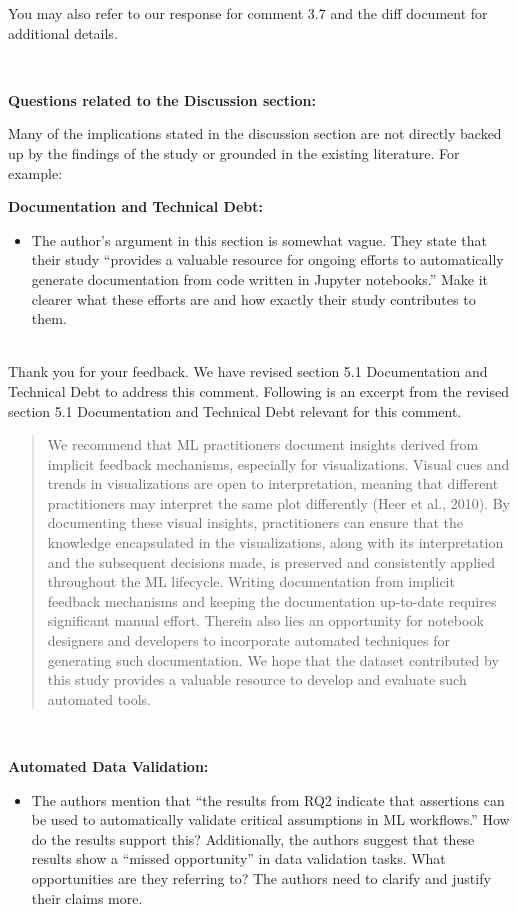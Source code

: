 \documentclass[11pt,fleqn]{article}
\newcommand{\eline}{\vspace*{.75\baselineskip}}
\newcommand{\Referee}[1]{\eline \noindent {\bf Reviewer comment #1:} \\}
\newcommand{\Us}{\eline \noindent {\bf Response:}\\}
\newenvironment{revcomment}[1][]
{\Referee{#1}\begin{rcomment}}
{\end{rcomment}}
\begin{document}
You may also refer to our response for comment 3.7 and the diff document for additional details.

\begin{revcomment}[3.11]
  \textbf{Questions related to the Discussion section:}

  Many of the implications stated in the discussion section are not directly backed up by the findings of the study or grounded in the existing literature. For example:

  \textbf{Documentation and Technical Debt:}

  \begin{itemize}
    \item The author's argument in this section is somewhat vague. They state that their study ``provides a valuable resource for ongoing efforts to automatically generate documentation from code written in Jupyter notebooks.'' Make it clearer what these efforts are and how exactly their study contributes to them.
  \end{itemize}
\end{revcomment}

\Us Thank you for your feedback. We have revised section 5.1 Documentation and Technical Debt to address this comment. Following is an excerpt from the revised section 5.1 Documentation and Technical Debt relevant for this comment.

\begin{quote}
  We recommend that ML practitioners document insights derived from implicit feedback mechanisms, especially for visualizations. Visual cues and trends in visualizations are open to interpretation, meaning that different practitioners may interpret the same plot differently (Heer et al., 2010). By documenting these visual insights, practitioners can ensure that the knowledge encapsulated in the visualizations, along with its interpretation and the subsequent decisions made, is preserved and consistently applied throughout the ML lifecycle. Writing documentation from implicit feedback mechanisms and keeping the documentation up-to-date requires significant manual effort. Therein also lies an opportunity for notebook designers and developers to incorporate automated techniques for generating such documentation. We hope that the dataset contributed by this study provides a valuable resource to develop and evaluate such automated tools.
\end{quote}

\begin{revcomment}[3.12]
  \textbf{Automated Data Validation:}

  \begin{itemize}
    \item The authors mention that ``the results from RQ2 indicate that assertions can be used to automatically validate critical assumptions in ML workflows.'' How do the results support this? Additionally, the authors suggest that these results show a ``missed opportunity'' in data validation tasks. What opportunities are they referring to? The authors need to clarify and justify their claims more.
  \end{itemize}
\end{revcomment}
\end{document}
